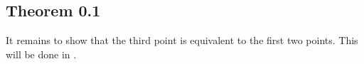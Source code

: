 \subsection{Theorem 0.1}

It remains to show that the third point is equivalent to the first two points.
This will be done in .
